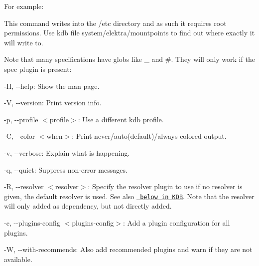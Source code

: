 For example\+:


\begin{DoxyCode}{0}
\end{DoxyCode}


This command writes into the {\ttfamily /etc} directory and as such it requires root permissions. Use {\ttfamily kdb file system/elektra/mountpoints} to find out where exactly it will write to.

Note that many specifications have globs like {\ttfamily \+\_\+} and {\ttfamily \#}. They will only work if the {\ttfamily spec} plugin is present\+:


\begin{DoxyCode}{0}
\end{DoxyCode}



\begin{DoxyItemize}
\item {\ttfamily -\/H}, {\ttfamily -\/-\/help}\+: Show the man page.
\item {\ttfamily -\/V}, {\ttfamily -\/-\/version}\+: Print version info.
\item {\ttfamily -\/p}, {\ttfamily -\/-\/profile $<$profile$>$}\+: Use a different kdb profile.
\item {\ttfamily -\/C}, {\ttfamily -\/-\/color $<$when$>$}\+: Print never/auto(default)/always colored output.
\item {\ttfamily -\/v}, {\ttfamily -\/-\/verbose}\+: Explain what is happening.
\item {\ttfamily -\/q}, {\ttfamily -\/-\/quiet}\+: Suppress non-\/error messages.
\item {\ttfamily -\/R}, {\ttfamily -\/-\/resolver $<$resolver$>$}\+: Specify the resolver plugin to use if no resolver is given, the default resolver is used. See also \href{\#KDB}{\texttt{ below in K\+DB}}. Note that the resolver will only added as dependency, but not directly added.
\item {\ttfamily -\/c}, {\ttfamily -\/-\/plugins-\/config $<$plugins-\/config$>$}\+: Add a plugin configuration for all plugins.
\item {\ttfamily -\/W}, {\ttfamily -\/-\/with-\/recommends}\+: Also add recommended plugins and warn if they are not available.
\end{DoxyItemize}


